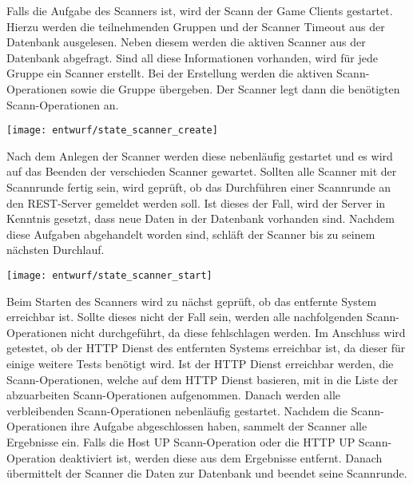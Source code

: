Falls die Aufgabe des Scanners  ist, wird der Scann der Game Clients gestartet. Hierzu werden die teilnehmenden Gruppen und der Scanner Timeout aus der Datenbank ausgelesen. Neben diesem werden die aktiven Scanner aus der Datenbank abgefragt. Sind all diese Informationen vorhanden, wird für jede Gruppe ein Scanner erstellt. Bei der Erstellung werden die aktiven Scann-Operationen sowie die Gruppe übergeben. Der Scanner legt dann die benötigten Scann-Operationen an.

\begin{center}
\texttt{[image: entwurf/state\_scanner\_create]}
\end{center}

Nach dem Anlegen der Scanner werden diese nebenläufig gestartet und es wird auf das Beenden der verschieden Scanner gewartet. Sollten alle Scanner mit der Scannrunde fertig sein, wird geprüft, ob das Durchführen einer Scannrunde an den REST-Server gemeldet werden soll. Ist dieses der Fall, wird der Server in Kenntnis gesetzt, dass neue Daten in der Datenbank vorhanden sind. Nachdem diese Aufgaben abgehandelt worden sind, schläft der Scanner bis zu seinem nächsten Durchlauf.

\begin{minipage}{\linewidth}
	\begin{center}
		\texttt{[image: entwurf/state\_scanner\_start]}
	\end{center}
\end{minipage}

Beim Starten des Scanners wird zu nächst geprüft, ob das entfernte System erreichbar ist. Sollte dieses nicht der Fall sein, werden alle nachfolgenden Scann-Operationen nicht durchgeführt, da diese fehlschlagen werden. Im Anschluss wird getestet, ob der HTTP Dienst des entfernten Systems erreichbar ist, da dieser für einige weitere Tests benötigt wird. Ist der HTTP Dienst erreichbar werden, die Scann-Operationen, welche auf dem HTTP Dienst basieren, mit in die Liste der abzuarbeiten Scann-Operationen aufgenommen. Danach werden alle verbleibenden Scann-Operationen nebenläufig gestartet. Nachdem die Scann-Operationen ihre Aufgabe abgeschlossen haben, sammelt der Scanner alle Ergebnisse ein. Falls die Host UP Scann-Operation oder die HTTP UP Scann-Operation deaktiviert ist, werden diese aus dem Ergebnisse entfernt. Danach übermittelt der Scanner die Daten zur Datenbank und beendet seine Scannrunde.

